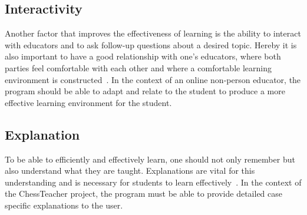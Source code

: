 
\subsection{Interactivity}\label{subsec:interactivity}

Another factor that improves the effectiveness of learning is the ability to interact with educators and to ask
follow-up questions about a desired topic.
Hereby it is also important to have a good relationship with one's educators, where both parties feel comfortable with
each other and where a comfortable learning environment is constructed~\cite{saha2009}.
In the context of an online non-person educator, the program should be able to adapt and relate to the student to
produce a more effective learning environment for the student.


\subsection{Explanation}\label{subsec:explanation}

To be able to efficiently and effectively learn, one should not only remember but also understand what they are taught.
Explanations are vital for this understanding and is necessary for students to learn effectively~\cite{williams2010}.
In the context of the ChessTeacher project, the program must be able to provide detailed case specific explanations to
the user.
